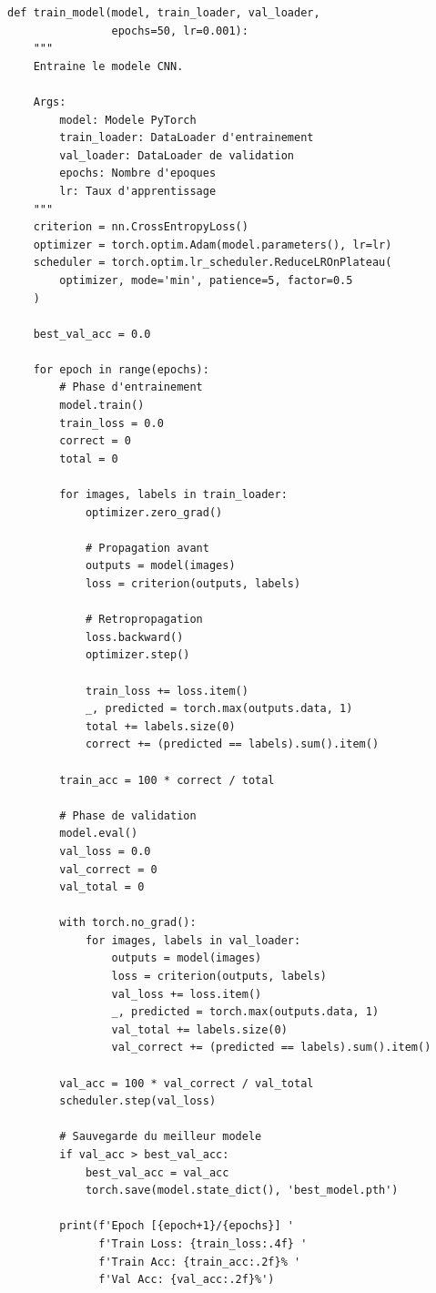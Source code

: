 \begin{lstlisting}[style=pythonstyle, caption={Boucle d'entraînement du CNN.}, label={lst:training}]
def train_model(model, train_loader, val_loader, 
                epochs=50, lr=0.001):
    """
    Entraine le modele CNN.
    
    Args:
        model: Modele PyTorch
        train_loader: DataLoader d'entrainement
        val_loader: DataLoader de validation
        epochs: Nombre d'epoques
        lr: Taux d'apprentissage
    """
    criterion = nn.CrossEntropyLoss()
    optimizer = torch.optim.Adam(model.parameters(), lr=lr)
    scheduler = torch.optim.lr_scheduler.ReduceLROnPlateau(
        optimizer, mode='min', patience=5, factor=0.5
    )
    
    best_val_acc = 0.0
    
    for epoch in range(epochs):
        # Phase d'entrainement
        model.train()
        train_loss = 0.0
        correct = 0
        total = 0
        
        for images, labels in train_loader:
            optimizer.zero_grad()
            
            # Propagation avant
            outputs = model(images)
            loss = criterion(outputs, labels)
            
            # Retropropagation
            loss.backward()
            optimizer.step()
            
            train_loss += loss.item()
            _, predicted = torch.max(outputs.data, 1)
            total += labels.size(0)
            correct += (predicted == labels).sum().item()
        
        train_acc = 100 * correct / total
        
        # Phase de validation
        model.eval()
        val_loss = 0.0
        val_correct = 0
        val_total = 0
        
        with torch.no_grad():
            for images, labels in val_loader:
                outputs = model(images)
                loss = criterion(outputs, labels)
                val_loss += loss.item()
                _, predicted = torch.max(outputs.data, 1)
                val_total += labels.size(0)
                val_correct += (predicted == labels).sum().item()
        
        val_acc = 100 * val_correct / val_total
        scheduler.step(val_loss)
        
        # Sauvegarde du meilleur modele
        if val_acc > best_val_acc:
            best_val_acc = val_acc
            torch.save(model.state_dict(), 'best_model.pth')
        
        print(f'Epoch [{epoch+1}/{epochs}] '
              f'Train Loss: {train_loss:.4f} '
              f'Train Acc: {train_acc:.2f}% '
              f'Val Acc: {val_acc:.2f}%')
\end{lstlisting}

